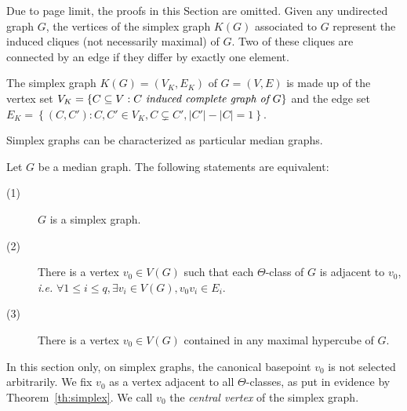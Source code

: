 \documentclass[a4paper,UKenglish,numberwithinsect,cleveref, autoref]{lipics-v2021}
\newcommand{\set}[1]{\left\{ #1 \right\}}
\newcommand{\card}[1]{\left| #1 \right|}
\begin{document}
Due to page limit, the proofs in this Section are omitted.
Given any undirected graph $G$, the vertices of the simplex graph $K(G)$ associated to $G$ represent the induced cliques (not necessarily maximal) of $G$. Two of these cliques are connected by an edge if they differ by exactly one element.

\begin{definition}
The simplex graph $K(G)=(V_K,E_K)$ of $G=(V,E)$ is made up of the vertex set $V_K = \set{C\subseteq V: C ~\emph{induced complete graph of}~ G}$ and the edge set $E_K = \set{(C,C') : C,C' \in V_K, C \subsetneq C', \card{C'}-\card{C} = 1}$.
\label{def:simplex}
\end{definition}

Simplex graphs can be characterized as particular median graphs.

\begin{theorem}
Let $G$ be a median graph. The following statements are equivalent:
\begin{description}
    \item[(1)] $G$ is a simplex graph.
    \item[(2)] There is a vertex $v_0 \in V(G)$ such that each $\Theta$-class of $G$ is adjacent to $v_0$, {\em i.e.} $\forall 1\le i\le q, \exists v_i\in V(G), v_0v_i \in E_i$.
    \item[(3)] There is a vertex $v_0 \in V(G)$ contained in any maximal hypercube of $G$.
\end{description}
\label{th:simplex}
\end{theorem}

In this section only, on simplex graphs, the canonical basepoint $v_0$ is not selected arbitrarily. We fix $v_0$ as a vertex adjacent to all $\Theta$-classes, as put in evidence by Theorem~\ref{th:simplex}. We call $v_0$ the \textit{central vertex} of the simplex graph.

\end{document}
